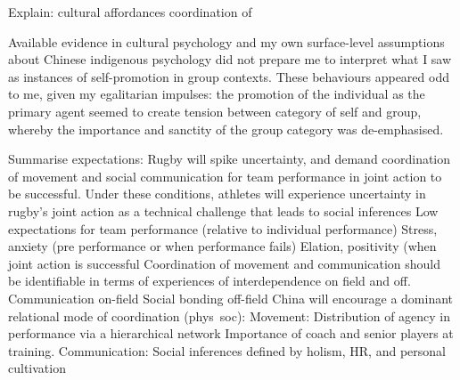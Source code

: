 \begin{CJK}{UTF8}{gbsn}
Explain: cultural affordances coordination of

Available evidence in cultural psychology and my own surface-level assumptions about Chinese indigenous psychology did not prepare me to interpret what I saw as instances of self-promotion in group contexts.  These behaviours appeared odd to me, given my egalitarian impulses: the promotion of the individual as the primary agent seemed to create tension between category of self and group, whereby the importance and sanctity of the group category was de-emphasised.

Summarise expectations:
 Rugby will spike uncertainty, and demand coordination of movement and social communication for team performance in joint action to be successful.
 Under these conditions, athletes will experience uncertainty in rugby’s joint action as a technical challenge that leads to social inferences
   Low expectations for team performance (relative to individual performance)
   Stress, anxiety (pre performance or when performance fails)
   Elation, positivity (when joint action is successful
 Coordination of movement and communication should be identifiable in terms of experiences of interdependence on field and off.
   Communication on-field
   Social bonding off-field
 China will encourage a dominant relational mode of coordination (phys~soc):
 Movement:
   Distribution of agency in performance via a hierarchical network
   Importance of coach and senior players at training.
 Communication:
   Social inferences defined by holism, HR, and personal cultivation
































            \end{CJK}
